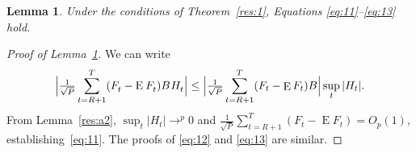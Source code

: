 \documentclass[12pt,fleqn]{article}
\newtheorem{lema}{Lemma}[section]
\theoremstyle{definition}
\DeclareMathOperator{\E}{E}
\newcommand{\osum}[1]{\sum_{#1=R+1}^T}
\newcommand{\oclt}[1]{\tfrac{1}{\sqrt{P}} \osum{#1}}
\begin{document}
\begin{lema}\label{res:a4}
  Under the conditions of Theorem~\ref{res:1}, Equations
  \eqref{eq:11}--\eqref{eq:13} hold.
\end{lema}

\begin{proof}[Proof of Lemma~\ref{res:a4}]
We can write
\begin{equation*}
  \Big\lvert \WesA \Big\rvert \leq 
  \Big\lvert \oclt{t} (F_t - \E F_t) B \Big\rvert
  \sup_t | H_t |.
\end{equation*}
From Lemma~\ref{res:a2}, $\sup_t | H_t | \to^p 0$ and $\oclt{t}
(F_t - \E F_t) = O_p(1)$, establishing~\eqref{eq:11}. The proofs
of \eqref{eq:12} and \eqref{eq:13} are similar.
\end{proof}


\end{document}
